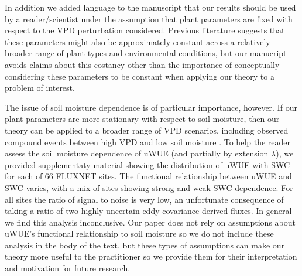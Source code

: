 \documentclass[12pt]{article}
\begin{document}
In addition we added language to the manuscript that our results
should be used by a reader/scientist under the assumption that plant
parameters are fixed with respect to the VPD perturbation
considered. Previous literature \citep{Zhou_2015, Lin_2015} suggests
that these parameters might also be approximately constant across a
relatively broader range of plant types and environmental conditions,
but our manucript avoids claims about this costancy other than the
importance of conceptually considering these parameters to be constant
when applying our theory to a problem of interest.

The issue of soil moisture dependence is of particular importance,
however. If our plant parameters are more stationary with respect to
soil moisture, then our theory can be applied to a broader range of
VPD scenarios, including observed compound events between high VPD and
low soil moisture \citep{Zhou_2019}. To help the reader assess the
soil moisture dependence of uWUE (and partially by extension
$\lambda$), we provided supplementaty material showing the
distribution of uWUE with SWC for each of 66 FLUXNET sites. The
functional relationship between uWUE and SWC varies, with a mix of
sites showing strong and weak SWC-dependence. For all sites the ratio
of signal to noise is very low, an unfortunate consequence of taking a
ratio of two highly uncertain eddy-covariance derived fluxes. In
general we find this analysis inconclusive. Our paper does not rely on
assumptions about uWUE's functional relationship to soil moisture so
we do not include these analysis in the body of the text, but these
types of assumptions can make our theory more useful to the
practitioner so we provide them for their interpretation and
motivation for future research.



\end{document}
